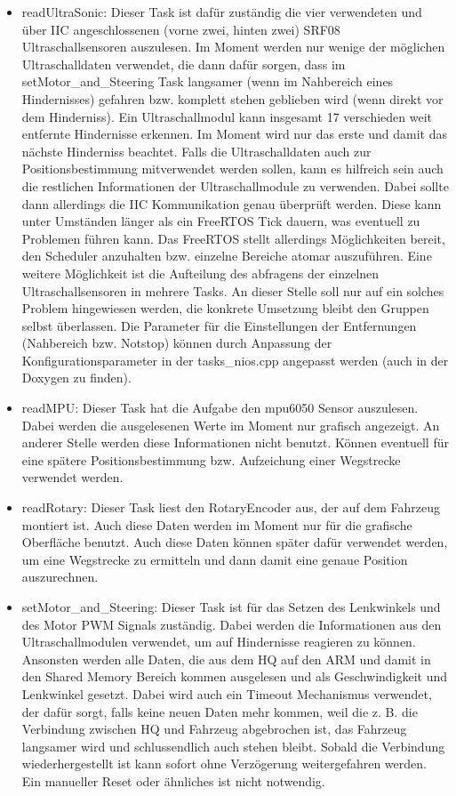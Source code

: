 \begin{itemize}
  \item readUltraSonic: Dieser Task ist dafür zuständig die vier verwendeten und über IIC angeschlossenen (vorne zwei, hinten zwei) SRF08 Ultraschallsensoren auszulesen. Im Moment werden nur wenige der möglichen Ultraschalldaten verwendet, die dann dafür sorgen, dass im setMotor\_and\_Steering Task langsamer (wenn im Nahbereich eines Hindernisses) gefahren bzw. komplett stehen geblieben wird (wenn direkt vor dem Hinderniss). Ein Ultraschallmodul kann insgesamt 17 verschieden weit entfernte Hindernisse erkennen. Im Moment wird nur das erste und damit das nächste Hinderniss beachtet. Falls die Ultraschalldaten auch zur Positionsbestimmung mitverwendet werden sollen, kann es hilfreich sein auch die restlichen Informationen der Ultraschallmodule zu verwenden. Dabei sollte dann allerdings die IIC Kommunikation genau überprüft werden. Diese kann unter Umständen länger als ein FreeRTOS Tick dauern, was eventuell zu Problemen führen kann. Das FreeRTOS stellt allerdings Möglichkeiten bereit, den Scheduler anzuhalten bzw. einzelne Bereiche atomar auszuführen. Eine weitere Möglichkeit ist die Aufteilung des abfragens der einzelnen Ultraschallsensoren in mehrere Tasks. An dieser Stelle soll nur auf ein solches Problem hingewiesen werden, die konkrete Umsetzung bleibt den Gruppen selbst überlassen. Die Parameter für die Einstellungen der Entfernungen (Nahbereich bzw. Notstop) können durch Anpassung der Konfigurationsparameter in der tasks\_nios.cpp angepasst werden (auch in der Doxygen zu finden).
  \item readMPU: Dieser Task hat die Aufgabe den mpu6050 Sensor auszulesen. Dabei werden die ausgelesenen Werte im Moment nur grafisch angezeigt. An anderer Stelle werden diese Informationen nicht benutzt. Können eventuell für eine spätere Positionsbestimmung bzw. Aufzeichung einer Wegstrecke verwendet werden.
  \item readRotary: Dieser Task liest den RotaryEncoder aus, der auf dem Fahrzeug montiert ist. Auch diese Daten werden im Moment nur für die grafische Oberfläche benutzt. Auch diese Daten können später dafür verwendet werden, um eine Wegstrecke zu ermitteln und dann damit eine genaue Position auszurechnen.
  \item setMotor\_and\_Steering: Dieser Task ist für das Setzen des Lenkwinkels und des Motor PWM Signals zuständig. Dabei werden die Informationen aus den Ultraschallmodulen verwendet, um auf Hindernisse reagieren zu können. Ansonsten werden alle Daten, die aus dem HQ auf den ARM und damit in den Shared Memory Bereich kommen ausgelesen und als Geschwindigkeit und Lenkwinkel gesetzt. Dabei wird auch ein Timeout Mechanismus verwendet, der dafür sorgt, falls keine neuen Daten mehr kommen, weil die z. B. die Verbindung zwischen HQ und Fahrzeug abgebrochen ist, das Fahrzeug langsamer wird und schlussendlich auch stehen bleibt. Sobald die Verbindung wiederhergestellt ist kann sofort ohne Verzögerung weitergefahren werden. Ein manueller Reset oder ähnliches ist nicht notwendig.

\end{itemize}
